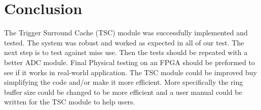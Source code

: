 \section{Conclusion}

The Trigger Surround Cache (TSC) module was successfully implemented and tested.
The system was robust and worked as expected in all of our test.
The next step is to test against miss use. Then the  tests should be repeated with a better ADC module.
Final Physical testing on an FPGA should be preformed to see if it works in real-world application.
The TSC module could be improved buy simplifying the code and/or make it more efficient.
More specifically the ring buffer size could be changed to be more efficient and a user manual could be written for the TSC module to help users.

